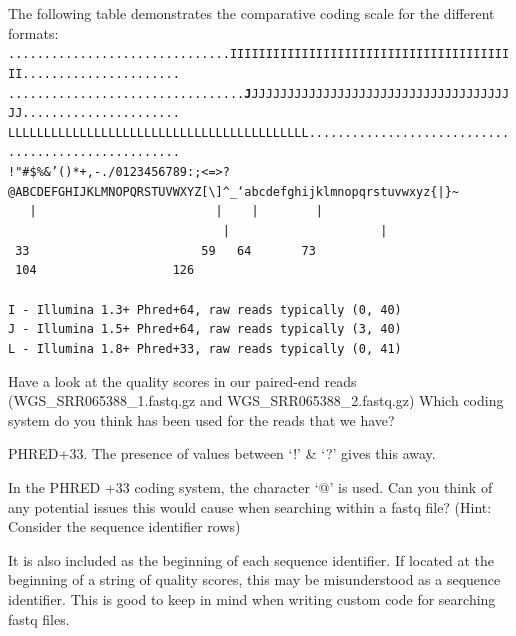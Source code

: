 \begin{minipage}{\textwidth}

The following table demonstrates the comparative coding scale for the different formats: \\

\scriptsize
\texttt{...............................IIIIIIIIIIIIIIIIIIIIIIIIIIIIIIIIIIIIIIIII...................... \\
.................................\textbf{J}JJJJJJJJJJJJJJJJJJJJJJJJJJJJJJJJJJJJJJ...................... \\
LLLLLLLLLLLLLLLLLLLLLLLLLLLLLLLLLLLLLLLLLL.................................................... \\
!"\#\$\%\&'()*+,-./0123456789:;\textless =\textgreater?@ABCDEFGHIJKLMNOPQRSTUVWXYZ[\textbackslash]\^{}\_`abcdefghijklmnopqrstuvwxyz\{|\}\~{}} \\
\texttt{
~~|~~~~~~~~~~~~~~~~~~~~~~~~~|~~~~|~~~~~~~~|~~~~~~~~~~~~~~~~~~~~~~~~~~~~~~|~~~~~~~~~~~~~~~~~~~~~|~\\
~33~~~~~~~~~~~~~~~~~~~~~~~~59~~~64~~~~~~~73~~~~~~~~~~~~~~~~~~~~~~~~~~~~104~~~~~~~~~~~~~~~~~~~126~\\
~ \\
I - Illumina 1.3+ Phred+64,  raw reads typically (0, 40) \\
J - Illumina 1.5+ Phred+64,  raw reads typically (3, 40) \\
L - Illumina 1.8+ Phred+33,  raw reads typically (0, 41) \\
}
\end{minipage}

\begin{questions}
Have a look at the quality scores in our paired-end reads (WGS\_SRR065388\_1.fastq.gz and WGS\_SRR065388\_2.fastq.gz)
Which coding system do you think has been used for the reads that we have? \\
\begin{answer}
PHRED+33.
The presence of values between `!' \& `?' gives this away.\\
\end{answer}
In the PHRED +33 coding system, the character `@' is used.
Can you think of any potential issues this would cause when searching within a fastq file?
(Hint: Consider the sequence identifier rows)\\
\begin{answer}
It is also included as the beginning of each sequence identifier.
If located at the beginning of a string of quality scores, this may be misunderstood as a sequence identifier.
This is good to keep in mind when writing custom code for searching fastq files.
\end{answer}
\end{questions}

